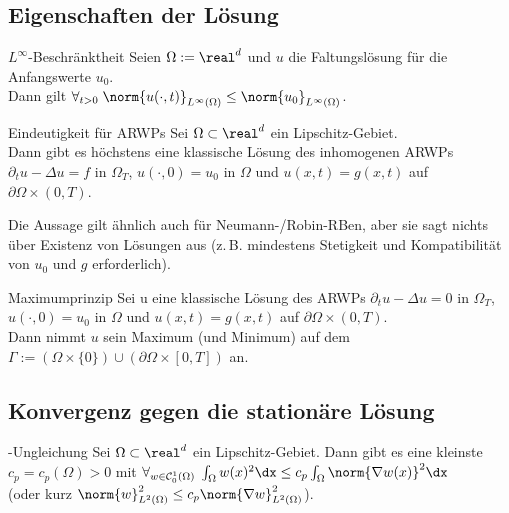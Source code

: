 \pagebreak

\subsection{%
    Eigenschaften der Lösung%
}

\begin{Satz}{$L^\infty$-Beschränktheit}
    Seien $\Omega := \real^d$ und $u$ die Faltungslösung für die Anfangswerte $u_0$.\\
    Dann gilt $\forall_{t > 0}\;
    \norm{u(\cdot, t)}_{L^\infty(\Omega)} \le \norm{u_0}_{L^\infty(\Omega)}$.
\end{Satz}

\linie

\begin{Satz}{Eindeutigkeit für ARWPs}
    Sei $\Omega \subset \real^d$ ein Lipschitz-Gebiet.\\
    Dann gibt es höchstens eine klassische Lösung des inhomogenen ARWPs\\
    $\partial_t u - \Delta u = f$ in $\Omega_T$,
    $u(\cdot, 0) = u_0$ in $\Omega$ und $u(x, t) = g(x, t)$ auf $\partial\Omega \times (0, T)$.
\end{Satz}

\begin{Bem}
    Die Aussage gilt ähnlich auch für Neumann-/Robin-RBen, aber sie sagt nichts über Existenz
    von Lösungen aus
    (z.\,B. mindestens Stetigkeit und Kompatibilität von $u_0$ und $g$ erforderlich).
\end{Bem}

\linie

\begin{Satz}{Maximumprinzip}
    Sei u eine klassische Lösung des ARWPs
    $\partial_t u - \Delta u = 0$ in $\Omega_T$,\\
    $u(\cdot, 0) = u_0$ in $\Omega$ und $u(x, t) = g(x, t)$ auf $\partial\Omega \times (0, T)$.\\
    Dann nimmt $u$ sein Maximum (und Minimum) auf dem
    \\
    $\Gamma := (\Omega \times \{0\}) \cup (\partial\Omega \times [0, T])$ an.
\end{Satz}

\subsection{%
    Konvergenz gegen die stationäre Lösung%
}

\begin{Satz}{-Ungleichung}
    Sei $\Omega \subset \real^d$ ein Lipschitz-Gebiet.
    Dann gibt es eine kleinste
     $c_p = c_p(\Omega) > 0$ mit
    $\forall_{w \in \C^1_0(\Omega)}\;
    \int_\Omega w(x)^2 \dx \le c_p \int_\Omega \norm{\nabla w(x)}^2 \dx$\\
    (oder kurz $\norm{w}_{L^2(\Omega)}^2 \le c_p \norm{\nabla w}_{L^2(\Omega)}^2$).
\end{Satz}

